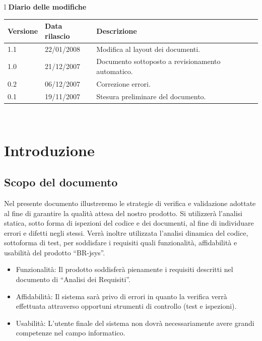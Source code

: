 \documentclass[11pt,titlepage,a4paper]{report}
\begin{document}
\begin{center}
\begin{table}[hbtp]
\large{
\begin{tabular}{l}
\Large{\textbf{\textsf{Diario delle modifiche}}} \\
\begin{tabular}{||p{2cm}||p{3.5cm}||p{6cm}||}
\hline
\textbf{Versione} & \textbf{Data rilascio} & \textbf{Descrizione} \\ \hline
1.1 & 22/01/2008 & Modifica al layout dei documenti.\\ \hline
1.0 & 21/12/2007 & Documento sottoposto a revisionamento automatico.\\ \hline
0.2 & 06/12/2007 & Correzione errori. \\ \hline
0.1 & 19/11/2007 & Stesura preliminare del documento. \\ \hline
\end{tabular} \\
\end{tabular}

}
\end{table}
\end{center}

\tableofcontents	%

\chapter{Introduzione}
\section{Scopo del documento}
Nel presente documento illustreremo le strategie di verifica e validazione adottate al fine di garantire la qualit\`a attesa del nostro prodotto. Si utilizzer\`a l'analisi statica, sotto forma di ispezioni del codice e dei documenti, al fine di individuare errori e difetti negli stessi. Verr\`a inoltre utilizzata l'analisi dinamica del codice, sottoforma di test, per soddisfare i requisiti quali funzionalit\`a, affidabilit\`a e usabilit\`a del prodotto ``BR-jsys''.
\begin{itemize}
\item Funzionalit\`a: \newline
Il prodotto soddisfer\`a pienamente i requisiti descritti nel documento di ``Analisi dei Requisiti''.
\item Affidabilit\`a: \newline
Il sistema sar\`a privo di errori in quanto la verifica verr\`a effettuata attraverso opportuni strumenti di controllo (test e ispezioni).
\item Usabilit\`a:
L'utente finale del sistema non dovr\`a necessariamente avere grandi competenze nel campo informatico.
\end{itemize}
\end{document}
